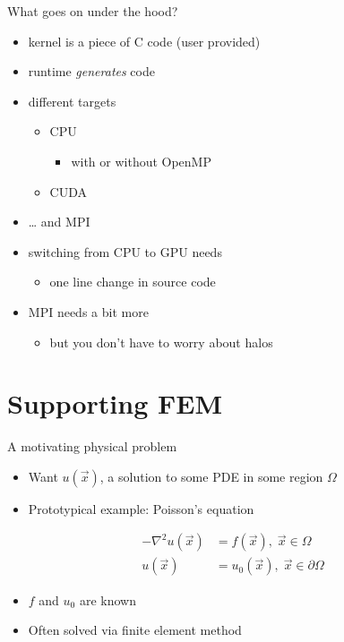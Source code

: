 \documentclass[bigger]{beamer}
\begin{document}
\begin{frame}[label={sec:orgheadline12}]{What goes on under the hood?}
\begin{itemize}
\item kernel is a piece of C code (user provided)
\item runtime \emph{generates} code
\item different targets
\begin{itemize}
\item CPU
\begin{itemize}
\item with or without OpenMP
\end{itemize}
\item CUDA
\end{itemize}
\item \ldots{} and MPI

\item switching from CPU to GPU needs
\begin{itemize}
\item one line change in source code
\end{itemize}
\item MPI needs a bit more
\begin{itemize}
\item but you don't have to worry about halos
\end{itemize}
\end{itemize}
\end{frame}

\section{Supporting FEM}
\label{sec:orgheadline20}

\begin{frame}[label={sec:orgheadline14}]{A motivating physical problem}
\begin{itemize}
\item Want \(u(\vec{x})\), a solution to some PDE in some region \(\Omega\)
\item Prototypical example: Poisson's equation
\end{itemize}
\begin{align*}
-\nabla^2 u(\vec{x}) &= f(\vec{x}), \; \vec{x} \in \Omega\\
 u(\vec{x}) &= u_0(\vec{x}), \; \vec{x} \in \partial\Omega
\end{align*}
\begin{itemize}
\item \(f\) and \(u_0\) are known
\item Often solved via finite element method
\end{itemize}
\end{frame}
\end{document}
